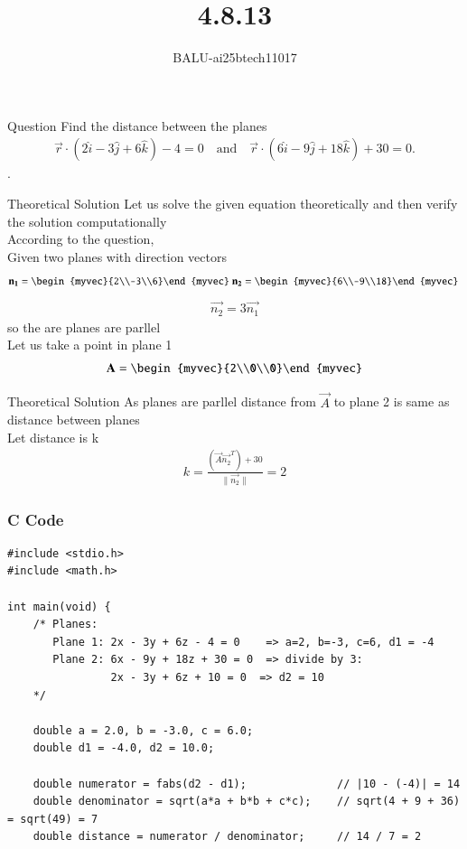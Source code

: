 \documentclass{beamer}
\title %
{4.8.13}
\author %
{BALU-ai25btech11017}
\begin{document}
\frame{\titlepage}
\begin{frame}{Question}
 Find the distance between the planes 
\begin{align}
\vec{r} \cdot (2\hat{i} - 3\hat{j} + 6\hat{k}) - 4 = 0
\quad \text{and} \quad
\vec{r} \cdot (6\hat{i} - 9\hat{j} + 18\hat{k}) + 30 = 0.
\end{align}
.\\ 
\end{frame}
\begin{frame}{Theoretical Solution}
Let us solve the given equation theoretically and then verify the solution computationally \\
According to the question, \\
Given two planes with direction vectors\\
\begin{align}
\vec{n_1}=\begin{myvec}{2\\-3\\6}\end{myvec}\
\vec{n_2}=\begin{myvec}{6\\-9\\18}\end{myvec}\
\end{align}
\begin{align}
    \vec{n_2}=3\vec{n_1}
\end{align}
so the are planes are parllel\\
Let us take a point in plane 1
\begin{align}
    \vec{A}=\begin{myvec}{2\\0\\0}\end{myvec}
\end{align}
\end{frame}
\begin{frame}{Theoretical Solution}
As planes are parllel distance from $\vec{A}$ to plane 2 is same as distance between planes\\
Let distance is k\\
\begin{align}
    k=\frac{(\vec{A}\vec{n_2}^T)+30}{\|\vec{n_2}\|}=2
\end{align}
\end{frame}
\begin{frame}[fragile]
    \frametitle{C Code}
    \begin{lstlisting}
#include <stdio.h>
#include <math.h>

int main(void) {
    /* Planes:
       Plane 1: 2x - 3y + 6z - 4 = 0    => a=2, b=-3, c=6, d1 = -4
       Plane 2: 6x - 9y + 18z + 30 = 0  => divide by 3:
                2x - 3y + 6z + 10 = 0  => d2 = 10
    */

    double a = 2.0, b = -3.0, c = 6.0;
    double d1 = -4.0, d2 = 10.0;

    double numerator = fabs(d2 - d1);              // |10 - (-4)| = 14
    double denominator = sqrt(a*a + b*b + c*c);    // sqrt(4 + 9 + 36) = sqrt(49) = 7
    double distance = numerator / denominator;     // 14 / 7 = 2

     \end{lstlisting}
\end{frame}
\end{document}
